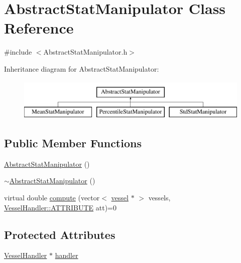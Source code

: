 \hypertarget{class_abstract_stat_manipulator}{}\section{Abstract\+Stat\+Manipulator Class Reference}
\label{class_abstract_stat_manipulator}


{\ttfamily \#include $<$Abstract\+Stat\+Manipulator.\+h$>$}

Inheritance diagram for Abstract\+Stat\+Manipulator\+:\begin{figure}[H]
\begin{center}
\leavevmode
\includegraphics[height=2.000000cm]{d7/d36/class_abstract_stat_manipulator}
\end{center}
\end{figure}
\subsection*{Public Member Functions}
\begin{DoxyCompactItemize}
\item 
\hyperlink{class_abstract_stat_manipulator_a793bdf3be04df16ca47da94f026dd64f}{Abstract\+Stat\+Manipulator} ()
\item 
\hyperlink{class_abstract_stat_manipulator_a64fcda02694b3ca94711d35ad555dbda}{$\sim$\+Abstract\+Stat\+Manipulator} ()
\item 
virtual double \hyperlink{class_abstract_stat_manipulator_a8ae1dd190a2c85ff4e219a48f92763b7}{compute} (vector$<$ \hyperlink{structvessel}{vessel} $\ast$ $>$ vessels, \hyperlink{class_vessel_handler_a6cc775e9a5bcbe69ef381f56b52982e7}{Vessel\+Handler\+::\+A\+T\+T\+R\+I\+B\+U\+TE} att)=0
\end{DoxyCompactItemize}
\subsection*{Protected Attributes}
\begin{DoxyCompactItemize}
\item 
\hyperlink{class_vessel_handler}{Vessel\+Handler} $\ast$ \hyperlink{class_abstract_stat_manipulator_aaa52b099a0a39da4b875f1e339df5668}{handler}
\end{DoxyCompactItemize}


